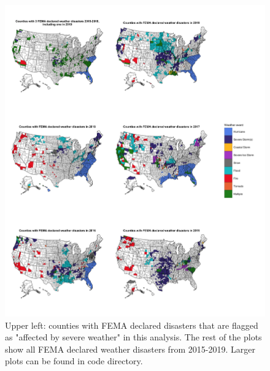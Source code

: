 \documentclass{article}
\begin{document}
\begin{figure}[H]
\centering
\includegraphics[scale=0.175]{images/fema_events_maps_combined.png}
\caption{Upper left: counties with FEMA declared disasters that are flagged as "affected by severe weather" in this analysis. The rest of the plots show all FEMA declared weather disasters from 2015-2019. Larger plots can be found in code directory.}
\end{figure}
\end{document}
